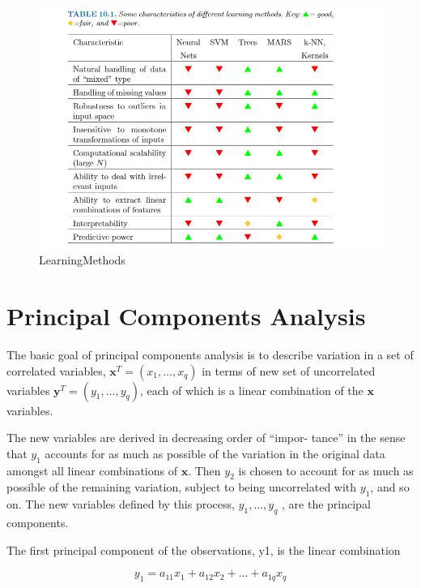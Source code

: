\begin{figure}[H]
\centering
\caption{LearningMethods}
\includegraphics[scale=.7]{Figures/learning-methods.PNG}
\end{figure}

\section{Principal Components Analysis}
The basic goal of principal components analysis is to describe variation in a set of correlated variables, $\textbf{x}^T = (x_1, \dots, x_q)$ in terms of new set of uncorrelated variables $\textbf{y}^T = (y_1, \dots, y_q)$, each of which is a linear combination of the $\textbf{x}$ variables.

The new variables are derived in decreasing order of “impor-
tance” in the sense that $y_1$ accounts for as much as possible of the variation in
the original data amongst all linear combinations of $\textbf{x}$. Then $y_2$ is chosen to
account for as much as possible of the remaining variation, subject to being
uncorrelated with $y_1$, and so on. The new variables defined by this process,
$y_1, \dots, y_q$ , are the principal components.

The first principal component of the observations, y1, is the linear combination

\begin{equation}
    y_1 = a_{11}x_1 + a_{12}x_2 + \dots + a_{1q}x_q
\end{equation}

